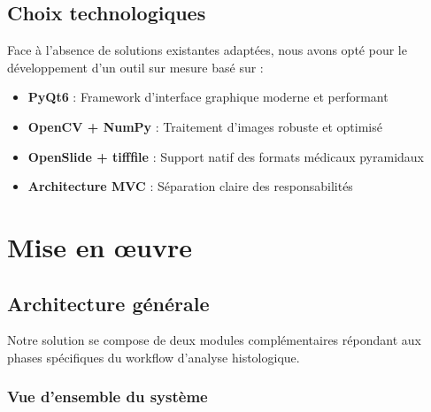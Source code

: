 \documentclass[11pt,a4paper]{report}
\begin{document}
\section{Choix technologiques}

Face à l'absence de solutions existantes adaptées, nous avons opté pour le développement d'un outil sur mesure basé sur :

\begin{itemize}
\item \textbf{PyQt6} : Framework d'interface graphique moderne et performant
\item \textbf{OpenCV + NumPy} : Traitement d'images robuste et optimisé
\item \textbf{OpenSlide + tifffile} : Support natif des formats médicaux pyramidaux
\item \textbf{Architecture MVC} : Séparation claire des responsabilités
\end{itemize}

\chapter{Mise en œuvre}

\section{Architecture générale}

Notre solution se compose de deux modules complémentaires répondant aux phases spécifiques du workflow d'analyse histologique.

\subsection{Vue d'ensemble du système}
\end{document}
